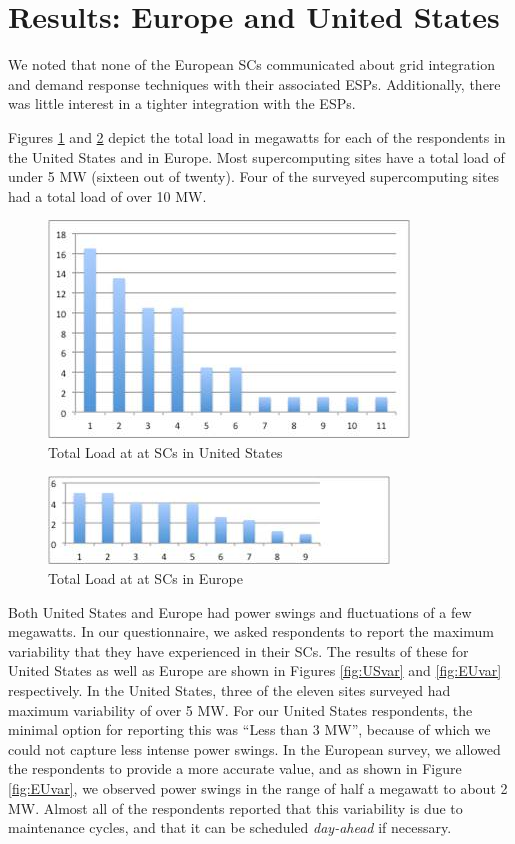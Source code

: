 \section{Results: Europe and United States}
\label{res}
We noted that none of the European SCs communicated about grid integration and demand response techniques with their associated ESPs. Additionally, there was little interest in a tighter integration with the ESPs.

Figures \ref{fig:USload} and \ref{fig:EUload} depict the total load in megawatts for each of the respondents in the United States and in Europe. Most supercomputing sites have a total load of under 5 MW (sixteen out of twenty). Four of the surveyed supercomputing sites had a total load of over 10 MW. 
\begin{figure}
\begin{center}
\includegraphics[scale=0.7]{figs/USLoad.jpg}
\caption{Total Load at at SCs in United States}
\label{fig:USload}
\end{center}
\end{figure}

\begin{figure}
\begin{center}
\includegraphics[scale=1]{figs/EULoad.jpg}
\caption{Total Load at at SCs in Europe}
\label{fig:EUload}
\end{center}
\end{figure}

Both United States and Europe had power swings and fluctuations of a few megawatts. In our questionnaire, we asked respondents to report the maximum variability that they have experienced in their SCs. The results of these for United States as well as Europe are shown in Figures \ref{fig:USvar} and \ref{fig:EUvar} respectively. In the United States, three of the eleven sites surveyed had maximum variability of over 5 MW. For our United States respondents, the minimal option for reporting this was ``Less than 3 MW'', because of which we could not capture less intense power swings. In the European survey, we allowed the respondents to provide a more accurate value, and as shown in Figure \ref{fig:EUvar}, we observed power swings in the range of half a megawatt to about 2 MW. Almost all of the respondents reported that this variability is due to maintenance cycles, and that it can be scheduled \emph{day-ahead} if necessary.

